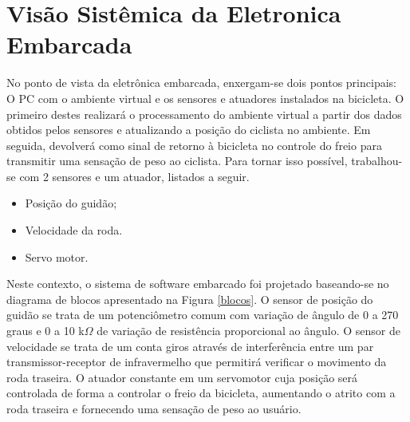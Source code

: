 




\section{Visão Sistêmica da Eletronica Embarcada} %
\label{sec:visao_sistemica}

No ponto de vista da eletrônica embarcada, enxergam-se dois pontos principais: O PC com o ambiente virtual e os sensores e atuadores instalados na bicicleta. O primeiro destes realizará o processamento do ambiente virtual a partir dos dados obtidos pelos sensores e atualizando a posição do ciclista no ambiente. Em seguida, devolverá como sinal de retorno à bicicleta no controle do freio para transmitir uma sensação de peso ao ciclista. Para tornar isso possível, trabalhou-se com 2 sensores e um atuador, listados a seguir.


\begin {itemize}
	\item Posição do guidão;
	\item Velocidade da roda.
	\item Servo motor.
\end  {itemize}

Neste contexto, o sistema de software embarcado foi projetado baseando-se no diagrama de blocos apresentado na Figura \ref{blocos}. O sensor de posição do guidão se trata de um potenciômetro comum com variação de ângulo de 0 a 270 graus e 0 a 10 k$\Omega$ de variação de resistência proporcional ao ângulo. O sensor de velocidade se trata de um conta giros através de interferência entre um par transmissor-receptor de infravermelho que permitirá verificar o movimento da roda traseira. O atuador constante em um servomotor cuja posição será controlada de forma a controlar o freio da bicicleta, aumentando o atrito com a roda traseira e fornecendo uma sensação de peso ao usuário.

